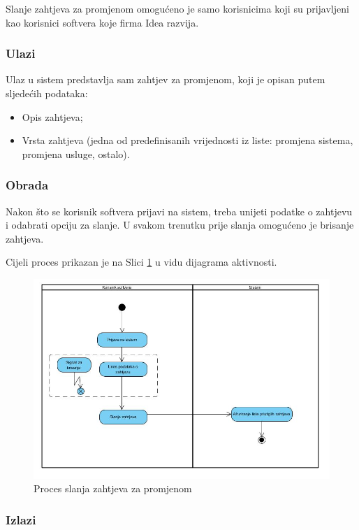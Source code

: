\documentclass[12pt,a4paper]{article}
\begin{document}
Slanje zahtjeva za promjenom omogućeno je samo korisnicima koji su prijavljeni kao korisnici softvera koje firma Idea razvija.

\subsubsection{Ulazi}

Ulaz u sistem predstavlja sam zahtjev za promjenom, koji je opisan putem sljedećih podataka:

\begin{itemize}
\item Opis zahtjeva;
\item Vrsta zahtjeva (jedna od predefinisanih vrijednosti iz liste: promjena sistema, promjena usluge, ostalo).
\end{itemize}

\subsubsection{Obrada}

Nakon što se korisnik softvera prijavi na sistem, treba unijeti podatke o zahtjevu i odabrati opciju za slanje. U svakom trenutku prije slanja omogućeno je brisanje zahtjeva.

Cijeli proces prikazan je na Slici \ref{act3} u vidu dijagrama aktivnosti.

\begin{figure}[H]
\center
\includegraphics[scale=0.5]{../res/Activity/activity3.JPG}
\caption{Proces slanja zahtjeva za promjenom}
\label{act3}
\end{figure}

\subsubsection{Izlazi}
\end{document}
